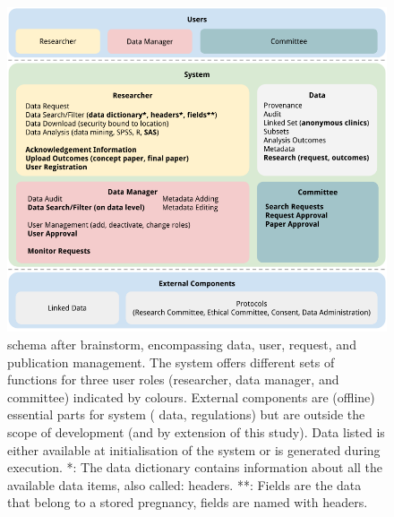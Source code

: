 \begin{figure}[!h]
	\centering
	\includegraphics[width=1.0\linewidth]{images/brainstorm-after}
	\caption{
		\ivfsystem{} schema after brainstorm, encompassing data, user, request, and publication management.
		The system offers different sets of functions for three user roles (researcher, data manager, and committee) indicated by colours. 
		External components are (offline) essential parts for system (\eg{} data, regulations) but are outside the scope of development (and by extension of this study).
		Data listed is either available at initialisation of the system or is generated during execution.
		*: The data dictionary contains information about all the available data items, also called: headers.
		**: Fields are the data that belong to a stored pregnancy, fields are named with headers.
	}
	\label{fig:brainstorm-after}
\end{figure}
